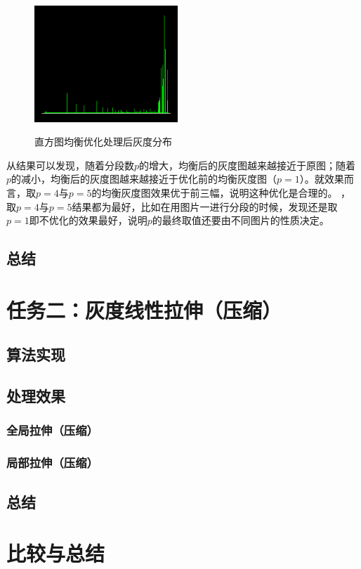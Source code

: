 \documentclass[UTF8]{ctexart}
\begin{document}
\begin{figure}[H]
{				\includegraphics[width=0.48\textwidth]{yuu_cor_5_hist.png}}
				\caption{直方图均衡优化处理后灰度分布}
			\end{figure}

			从结果可以发现，随着分段数$p$的增大，均衡后的灰度图越来越接近于原图；随着$p$的减小，均衡后的灰度图越来越接近于优化前的均衡灰度图（$p=1$）。就效果而言，取$p=4$与$p=5$的均衡灰度图效果优于前三幅，说明这种优化是合理的。\newline
			，取$p=4$与$p=5$结果都为最好，比如在用图片一进行分段的时候，发现还是取$p=1$即不优化的效果最好，说明$p$的最终取值还要由不同图片的性质决定。

		\subsection{总结}




	\section{任务二：灰度线性拉伸（压缩）}
		\subsection{算法实现}
		\subsection{处理效果}
			\subsubsection{全局拉伸（压缩）}
			\subsubsection{局部拉伸（压缩）}
		\subsection{总结}
	\section{比较与总结}
\end{document}
